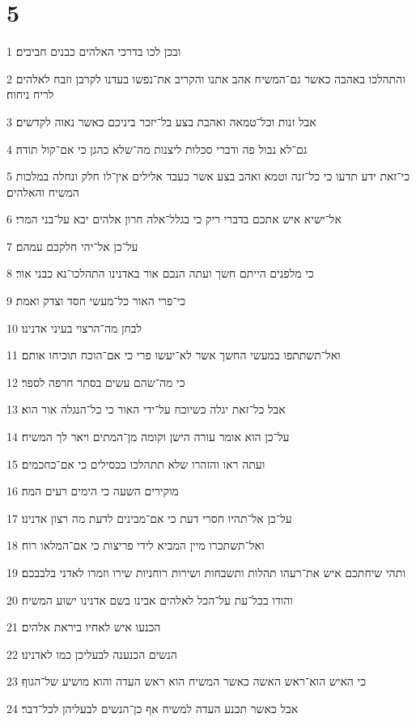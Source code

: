 \chapter{5}

\par 1 ובכן לכו בדרכי האלהים כבנים חביבים׃
\par 2 והתהלכו באהבה כאשר גם־המשיח אהב אתנו והקריב את־נפשו בעדנו לקרבן וזבח לאלהים לריח ניחוח׃
\par 3 אבל זנות וכל־טמאה ואהבת בצע בל־יזכר ביניכם כאשר נאוה לקדשים׃
\par 4 גם־לא נבול פה ודברי סכלות ליצנות מה־שלא כהגן כי אם־קול תודה׃
\par 5 כי־זאת ידע תדעו כי כל־זנה וטמא ואהב בצע אשר כעבד אלילים אין־לו חלק ונחלה במלכות המשיח והאלהים׃
\par 6 אל־ישיא איש אתכם בדברי ריק כי בגלל־אלה חרון אלהים יבא על־בני המרי׃
\par 7 על־כן אל־יהי חלקכם עמהם׃
\par 8 כי מלפנים הייתם חשך ועתה הנכם אור באדנינו התהלכו־נא כבני אור׃
\par 9 כי־פרי האור כל־מעשי חסד וצדק ואמת׃
\par 10 לבחן מה־הרצוי בעיני אדנינו׃
\par 11 ואל־תשתתפו במעשי החשך אשר לא־יעשו פרי כי אם־הוכח תוכיחו אותם׃
\par 12 כי מה־שהם עשים בסתר חרפה לספר׃
\par 13 אבל כל־זאת יגלה כשיוכח על־ידי האור כי כל־הנגלה אור הוא׃
\par 14 על־כן הוא אומר עורה הישן וקומה מן־המתים ויאר לך המשיח׃
\par 15 ועתה ראו והזהרו שלא תתהלכו ככסילים כי אם־כחכמים׃
\par 16 מוקירים השעה כי הימים רעים המה׃
\par 17 על־כן אל־תהיו חסרי דעת כי אם־מבינים לדעת מה רצון אדנינו׃
\par 18 ואל־תשתכרו מיין המביא לידי פריצות כי אם־המלאו רוח׃
\par 19 ותהי שיחתכם איש את־רעהו תהלות ותשבחות ושירות רוחניות שירו וזמרו לאדני בלבבכם׃
\par 20 והודו בכל־עת על־הכל לאלהים אבינו בשם אדנינו ישוע המשיח׃
\par 21 הכנעו איש לאחיו ביראת אלהים׃
\par 22 הנשים הכנענה לבעליכן כמו לאדנינו׃
\par 23 כי האיש הוא־ראש האשה כאשר המשיח הוא ראש העדה והוא מושיע של־הגוף׃
\par 24 אבל כאשר תכנע העדה למשיח אף כן־הנשים לבעליהן לכל־דבר׃
